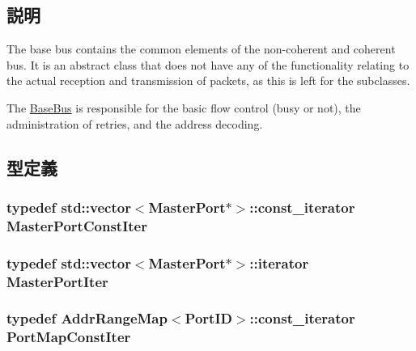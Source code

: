 \subsection{説明}
The base bus contains the common elements of the non-\/coherent and coherent bus. It is an abstract class that does not have any of the functionality relating to the actual reception and transmission of packets, as this is left for the subclasses.

The \hyperlink{classBaseBus}{BaseBus} is responsible for the basic flow control (busy or not), the administration of retries, and the address decoding. 

\subsection{型定義}
\hypertarget{classBaseBus_a19db300fe0038b9addfe69a31ef83b3d}{
\subsubsection[{MasterPortConstIter}]{\setlength{\rightskip}{0pt plus 5cm}typedef {\bf std::vector}$<${\bf MasterPort}$\ast$$>$::const\_\-iterator {\bf MasterPortConstIter}}}
\label{classBaseBus_a19db300fe0038b9addfe69a31ef83b3d}
\hypertarget{classBaseBus_a44e87d907bdab92a2169caddd28979f9}{
\subsubsection[{MasterPortIter}]{\setlength{\rightskip}{0pt plus 5cm}typedef {\bf std::vector}$<${\bf MasterPort}$\ast$$>$::iterator {\bf MasterPortIter}}}
\label{classBaseBus_a44e87d907bdab92a2169caddd28979f9}
\hypertarget{classBaseBus_ad31cae2c5a87fd020ee036a5d94c7420}{
\subsubsection[{PortMapConstIter}]{\setlength{\rightskip}{0pt plus 5cm}typedef {\bf AddrRangeMap}$<${\bf PortID}$>$::const\_\-iterator {\bf PortMapConstIter}}}
